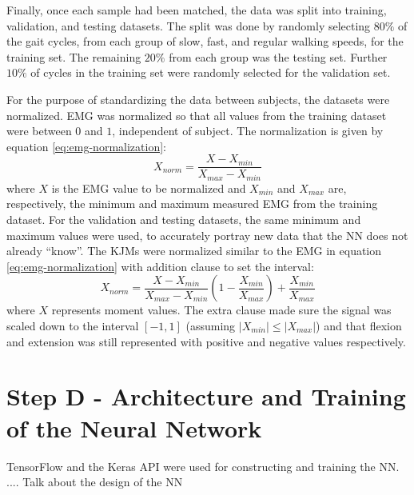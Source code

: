 \documentclass[../main.tex]{subfiles}
\begin{document}
Finally, once each sample had been matched, the data was split into training, validation, and testing datasets.
The split was done by randomly selecting $80\%$ of the gait cycles, from each group of slow, fast, and regular walking speeds, for the training set.
The remaining $20\%$ from each group was the testing set.
Further $10\%$ of cycles in the training set were randomly selected for the validation set.

For the purpose of standardizing the data between subjects, the datasets were normalized.
\ac{EMG} was normalized so that all values from the training dataset were between $0$ and $1$, independent of subject.
The normalization is given by equation \ref{eq:emg-normalization}:
\begin{equation}
\label{eq:emg-normalization}
    X_{norm} = \frac{X - X_{min}}{X_{max} - X_{min}}
\end{equation}
where $X$ is the \ac{EMG} value to be normalized and $X_{min}$ and $X_{max}$ are, respectively, the minimum and maximum measured \ac{EMG} from the training dataset. 
For the validation and testing datasets, the same minimum and maximum values were used, to accurately portray new data that the \ac{NN} does not already ``know''.
The \acp{KJM} were normalized similar to the \ac{EMG} in equation \ref{eq:emg-normalization} with addition clause to set the interval:
\begin{equation}
\label{eq:moment-normalization}
    X_{norm} = \frac{X - X_{min}}{X_{max} - X_{min}}\left(1 - \frac{X_{min}}{X_{max}}\right) + \frac{X_{min}}{X_{max}}
\end{equation}
where $X$ represents moment values. 
The extra clause made sure the signal was scaled down to the interval $[-1,1]$ (assuming $\left|X_{min}\right| \leq \left|X_{max}\right|$) and that flexion and extension was still represented with positive and negative values respectively.

\section{Step D - Architecture and Training of the Neural Network}
TensorFlow \cite{tensorflow2015-whitepaper} and the Keras API \cite{chollet2015keras} were used for constructing and training the \ac{NN}.
.... Talk about the design of the \ac{NN}
\end{document}
